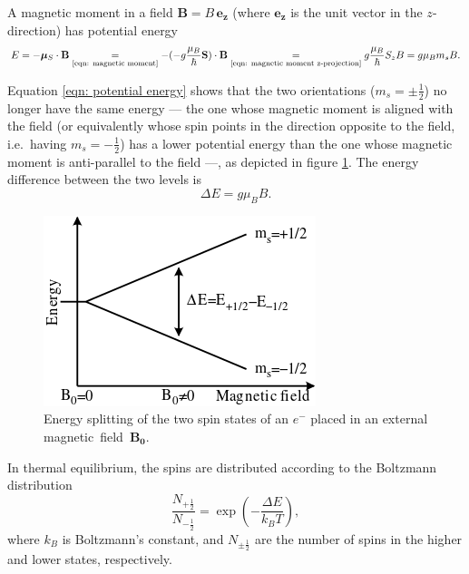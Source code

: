 \documentclass[a4paper]{jpconf}
\numberwithin{equation}{section}
\begin{document}
A magnetic moment in a field $\mathbf{B} = B \, \mathbf{e_z}$ (where $\mathbf{e_z}$ is the unit vector in the $z$-direction) has potential energy
\begin{equation}
	E = - \bm{\mu}_S \cdot \mathbf{B} \underset{\text{\eqref{eqn: magnetic moment}}}{=}  - (- g \frac{\mu_B}{\hbar} \mathbf{S})\cdot\mathbf{B}
	  \underset{\text{\eqref{eqn: magnetic moment z-projection}}}{=} g \frac{\mu_B}{\hbar}S_z B 
	  = g\mu_Bm_sB \label{eqn: potential energy}.
\end{equation}

Equation \eqref{eqn: potential energy} shows that the two orientations ($m_s = \pm\tfrac12$) no longer have the same energy --- the one whose magnetic moment is aligned with the field (or equivalently whose spin points in the direction opposite to the field, i.e.\ having $m_s = -\tfrac12$) has a lower potential energy than the one whose magnetic moment is anti-parallel to the field ---, as depicted in figure \ref{fig: energy splitting}. The energy difference between the two levels is 
\begin{equation}
	\Delta E = g \mu_B B. \label{eqn: energy difference}
\end{equation}

\begin{figure}[htbp]
	\includegraphics[scale=0.75]{EPR_splitting.png}
	\hspace{2pc}
	\begin{minipage}[b]{3in}
		\caption{Energy splitting of the two spin states of an $e^-$ placed in an external magnetic~field~$\mathbf{B_0}$.}
	\end{minipage}
	\label{fig: energy splitting}
\end{figure}

In thermal equilibrium, the spins are distributed according to the Boltzmann distribution
\[
    \frac{N_{+\tfrac12}}{N_{-\tfrac12}} = \exp(- \frac{\Delta E}{k_B T}),
\]
where $k_B$ is Boltzmann\textquoteright s constant, and $N_{\pm\tfrac12}$ are the number of spins in the higher and lower states, respectively. 
\end{document}
